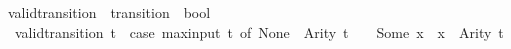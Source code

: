 \begin{isabellebody}
\isanewline
{}\isamarkupfalse%
\ valid{\isacharunderscore}transition\ {\isacharcolon}{\isacharcolon}\ {\isachardoublequoteopen}transition\ {\isasymRightarrow}\ bool{\isachardoublequoteclose}\ \isanewline
\ \ {\isachardoublequoteopen}valid{\isacharunderscore}transition\ t\ {\isacharequal}\ {\isacharparenleft}case\ max{\isacharunderscore}input\ t\ of\ None\ {\isasymRightarrow}\ Arity\ t\ {\isacharequal}\ {}\ {\isacharbar}\ Some\ x\ {\isasymRightarrow}\ x\ {\isacharless}\ Arity\ t{\isacharparenright}{\isachardoublequoteclose}\isanewline
%
\isadelimtheory
\isanewline
%
\endisadelimtheory
%
\isatagtheory
{}\isamarkupfalse%
%
\endisatagtheory
{\isafoldtheory}%
%
\isadelimtheory
%
\endisadelimtheory
%
\end{isabellebody}%
\endinput
